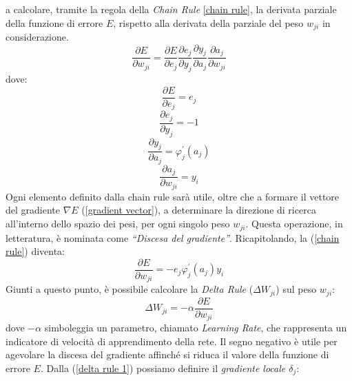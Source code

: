 a calcolare, tramite la regola della \emph{Chain Rule} \ref{chain rule}, la derivata parziale della funzione 
di errore $E$, rispetto alla derivata della parziale del peso $w_{ji}$ in considerazione.
\begin{equation}\label{chain rule}
    \frac{\partial E}{\partial w_{ji}} = \frac{\partial E}{\partial e_{j}} 
    \frac{\partial e_{j}}{\partial y_{j}}
    \frac{\partial y_{j}}{\partial a_{j}}
    \frac{\partial a_{j}}{\partial w_{ji}}
\end{equation}
dove:
\begin{equation}\label{derivation solved 1}
    \frac{\partial E}{\partial e_{j}} = e_j
\end{equation}
\begin{equation}\label{derivation solved 2}
    \frac{\partial e_{j}}{\partial y_{j}} = -1
\end{equation}
\begin{equation}\label{derivation solved 3}
    \frac{\partial y_{j}}{\partial a_{j}} = \varphi_j^{'}(a_j)
\end{equation}
\begin{equation}\label{derivation solved 4}
    \frac{\partial a_{j}}{\partial w_{ji}} = y_i
\end{equation}
Ogni elemento definito dalla chain rule sarà utile, oltre che a formare il vettore 
del gradiente $\nabla{E}$ (\ref{gradient vector}), a determinare la direzione di ricerca all'interno dello spazio 
dei pesi, per ogni singolo peso $w_{ji}$. Questa operazione, in letteratura, è nominata 
come \emph{“Discesa del gradiente”}. Ricapitolando, la (\ref{chain rule}) diventa:
\begin{equation}\label{chain rule update}
    \frac{\partial E}{\partial w_{ji}} = -e_j\varphi_j^{'}(a_j)y_i
\end{equation}
Giunti a questo punto, è possibile calcolare la \emph{Delta Rule} ($\Delta{W_{ji}}$) sul peso $w_{ji}$:
\begin{equation}\label{delta rule 1}
    \Delta{W_{ji}} = -\alpha \frac{\partial E}{\partial w_{ji}}
\end{equation}
dove $-\alpha$ simboleggia un parametro, chiamato \emph{Learning Rate}, che rappresenta 
un indicatore di velocità di apprendimento della rete. Il segno negativo è utile 
per agevolare la discesa del gradiente affinché si riduca il valore della funzione di
errore $E$. Dalla (\ref{delta rule 1}) possiamo definire il \emph{gradiente locale $\delta_j$}:
